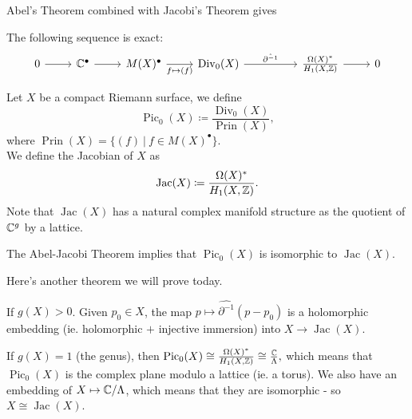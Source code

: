 \documentclass{article}
\begin{document}
{Abel's Theorem combined with Jacobi's Theorem gives
\begin{theorem}
    The following sequence is exact:
\[\begin{tikzcd}
	0 & {\Cbb^\bullet} & {M(X)^\bullet} & {\operatorname{Div}_0(X)} && {\frac{\Omega(X)^*}{H_1(X, \Zbb)}} & 0
	\arrow[from=1-1, to=1-2]
	\arrow[from=1-2, to=1-3]
	\arrow["{f \mapsto (f)}"', from=1-3, to=1-4]
	\arrow["{\hat{\partial^{-1}}}", from=1-4, to=1-6]
	\arrow[from=1-6, to=1-7]
\end{tikzcd}\]
\end{theorem}

\begin{definition}
    Let $X$ be a compact Riemann surface, we define
    \[\operatorname{Pic}_0(X) \coloneqq \frac{\operatorname{Div}_0(X)}{\operatorname{Prin}(X)},\]
    where $\operatorname{Prin}(X) = \{(f)\ |\ f \in M(X)^\bullet\}$.\\

    We define the Jacobian of $X$ as
    \[\operatorname{Jac}(X) \coloneqq \frac{\Omega(X)^*}{H_1(X, \mathbb{Z})}.\]
    Note that $\operatorname{Jac}(X)$ has a natural complex manifold structure as the quotient of $\mathbb{C}^g$ by a lattice.
\end{definition}

\begin{corollary}
    The Abel-Jacobi Theorem implies that $\operatorname{Pic}_0(X)$ is isomorphic to $\operatorname{Jac}(X)$.
\end{corollary}

Here's another theorem we will prove today.
\begin{theorem}\label{thm:embedding_to_Jacobian}
    If $g(X) > 0$. Given $p_0 \in X$, the map $p \mapsto \hat{\partial^{-1}}(p - p_0)$ is a holomorphic embedding (ie. holomorphic $+$ injective immersion) into $X \to \operatorname{Jac}(X)$.
\end{theorem}

\begin{corollary}
    If $g(X) = 1$ (the genus), then $\operatorname{Pic}_0(X) \cong \frac{\Omega(X)^*}{H_1(X, \mathbb{Z})} \cong \frac{\mathbb{C}}{\Lambda}, $ which means that $\operatorname{Pic}_0(X)$ is the complex plane modulo a lattice (ie. a torus). We also have an embedding of $X \mapsto \mathbb{C}/\Lambda$, which means that they are isomorphic - so $X \cong \operatorname{Jac}(X)$.\\


\end{corollary}}
\end{document}
